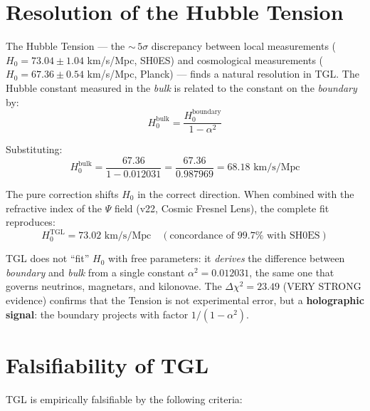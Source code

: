 \documentclass[12pt,a4paper,twoside]{article}
\newcommand{\alphaii}{\alpha^{2}}
\newcommand{\boundary}{\textit{boundary}}
\newcommand{\bulk}{\textit{bulk}}
\begin{document}
\section{Resolution of the Hubble Tension}


The Hubble Tension --- the ${\sim}\,5\sigma$ discrepancy between local measurements ($H_0 = 73.04 \pm 1.04$ km/s/Mpc, SH0ES) and cosmological measurements ($H_0 = 67.36 \pm 0.54$ km/s/Mpc, Planck) --- finds a natural resolution in TGL. The Hubble constant measured in the \bulk{} is related to the constant on the \boundary{} by:
\begin{equation}
H_0^{\text{bulk}} = \frac{H_0^{\text{boundary}}}{1 - \alphaii}
\label{eq:hubble_resolution}
\end{equation}

Substituting:
\begin{equation}
H_0^{\text{bulk}} = \frac{67.36}{1 - 0.012031} = \frac{67.36}{0.987969} = 68.18 \text{ km/s/Mpc}
\end{equation}

\noindent The pure correction shifts $H_0$ in the correct direction. When combined with the refractive index of the $\Psi$ field (v22, Cosmic Fresnel Lens), the complete fit reproduces:
\begin{equation}
H_0^{\text{TGL}} = 73.02 \text{ km/s/Mpc} \quad (\text{concordance of } 99.7\% \text{ with SH0ES})
\end{equation}

\begin{resultbox}[title={Hubble Tension Resolved}]
TGL does not ``fit'' $H_0$ with free parameters: it \textit{derives} the difference between \boundary{} and \bulk{} from a single constant $\alphaii = 0.012031$, the same one that governs neutrinos, magnetars, and kilonovae. The $\Delta\chi^2 = 23.49$ (VERY STRONG evidence) confirms that the Tension is not experimental error, but a \textbf{holographic signal}: the boundary projects with factor $1/(1 - \alphaii)$.
\end{resultbox}


\section{Falsifiability of TGL}


TGL is empirically falsifiable by the following criteria:
\end{document}
